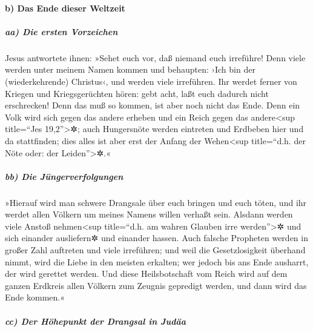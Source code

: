 \hypertarget{b-das-ende-dieser-weltzeit}{%
\paragraph{b) Das Ende dieser
Weltzeit}\label{b-das-ende-dieser-weltzeit}}

\hypertarget{aa-die-ersten-vorzeichen}{%
\subparagraph{aa) Die ersten
Vorzeichen}\label{aa-die-ersten-vorzeichen}}

 Jesus antwortete ihnen: »Sehet euch vor, daß niemand euch
irreführe!  Denn viele werden unter meinem Namen kommen
und behaupten: ›Ich bin der (wiederkehrende) Christus‹, und werden viele
irreführen.  Ihr werdet ferner von Kriegen und
Kriegsgerüchten hören: gebt acht, laßt euch dadurch nicht erschrecken!
Denn das muß so kommen, ist aber noch nicht das Ende. 
Denn ein Volk wird sich gegen das andere erheben und ein Reich gegen das
andere\textless sup title=``Jes 19,2''\textgreater✲; auch Hungersnöte
werden eintreten und Erdbeben hier und da stattfinden; 
dies alles ist aber erst der Anfang der Wehen\textless sup title=``d.h.
der Nöte oder: der Leiden''\textgreater✲.«

\hypertarget{bb-die-juxfcngerverfolgungen}{%
\subparagraph{bb) Die
Jüngerverfolgungen}\label{bb-die-juxfcngerverfolgungen}}

 »Hierauf wird man schwere Drangsale über euch bringen und
euch töten, und ihr werdet allen Völkern um meines Namens willen verhaßt
sein.  Alsdann werden viele Anstoß nehmen\textless sup
title=``d.h. am wahren Glauben irre werden''\textgreater✲ und sich
einander ausliefern✲ und einander hassen.  Auch falsche
Propheten werden in großer Zahl auftreten und viele irreführen;
 und weil die Gesetzlosigkeit überhand nimmt, wird die
Liebe in den meisten erkalten;  wer jedoch bis ans Ende
ausharrt, der wird gerettet werden.  Und diese
Heilsbotschaft vom Reich wird auf dem ganzen Erdkreis allen Völkern zum
Zeugnis gepredigt werden, und dann wird das Ende kommen.«

\hypertarget{cc-der-huxf6hepunkt-der-drangsal-in-juduxe4a}{%
\subparagraph{cc) Der Höhepunkt der Drangsal in
Judäa}\label{cc-der-huxf6hepunkt-der-drangsal-in-juduxe4a}}

